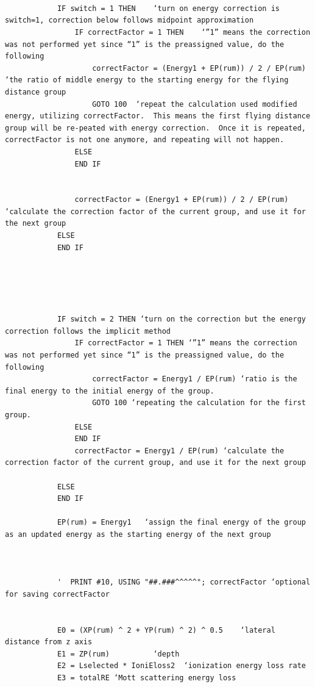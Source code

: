\documentclass[10pt, reqno]{exam}
\begin{document}
\begin{verbatim}

    
    
            IF switch = 1 THEN    ‘turn on energy correction is switch=1, correction below follows midpoint approximation
                IF correctFactor = 1 THEN    ‘”1” means the correction was not performed yet since “1” is the preassigned value, do the following
                    correctFactor = (Energy1 + EP(rum)) / 2 / EP(rum)  ‘the ratio of middle energy to the starting energy for the flying distance group
                    GOTO 100  ‘repeat the calculation used modified energy, utilizing correctFactor.  This means the first flying distance group will be re-peated with energy correction.  Once it is repeated,  correctFactor is not one anymore, and repeating will not happen. 
                ELSE
                END IF
    
    
                correctFactor = (Energy1 + EP(rum)) / 2 / EP(rum)   ‘calculate the correction factor of the current group, and use it for the next group
            ELSE
            END IF
    
    
            
    
    
            IF switch = 2 THEN ‘turn on the correction but the energy correction follows the implicit method
                IF correctFactor = 1 THEN ‘”1” means the correction was not performed yet since “1” is the preassigned value, do the following
                    correctFactor = Energy1 / EP(rum) ‘ratio is the final energy to the initial energy of the group. 
                    GOTO 100 ‘repeating the calculation for the first group. 
                ELSE
                END IF
                correctFactor = Energy1 / EP(rum) ‘calculate the correction factor of the current group, and use it for the next group
    
            ELSE
            END IF
    
            EP(rum) = Energy1   ‘assign the final energy of the group as an updated energy as the starting energy of the next group 
    
    
    
            '  PRINT #10, USING "##.###^^^^^"; correctFactor ‘optional for saving correctFactor
    
    
            E0 = (XP(rum) ^ 2 + YP(rum) ^ 2) ^ 0.5    ‘lateral distance from z axis
            E1 = ZP(rum)          ‘depth                           
            E2 = Lselected * IoniEloss2  ‘ionization energy loss rate
            E3 = totalRE ‘Mott scattering energy loss
    

\end{verbatim}
\end{document}
